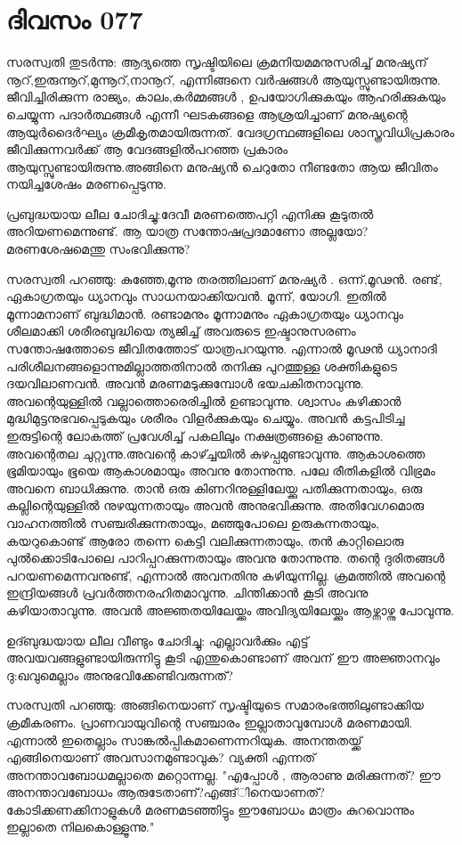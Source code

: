 \newpage
\section{ദിവസം 077}


സരസ്വതി തുടര്‍ന്നു: ആദ്യത്തെ സൃഷ്ടിയിലെ ക്രമനിയമമനുസരിച്ച്‌ മനുഷ്യന്‌ നൂറ്‌,ഇരുന്നൂറ്‌,മുന്നൂറ്‌,നാനൂറ്‌, എന്നിങ്ങനെ വര്‍ഷങ്ങള്‍ ആയുസ്സുണ്ടായിരുന്നു. ജീവിച്ചിരിക്കുന്ന രാജ്യം, കാലം,കര്‍മ്മങ്ങള്‍ , ഉപയോഗിക്കുകയും ആഹരിക്കുകയും ചെയ്യുന്ന പദാര്‍ത്ഥങ്ങള്‍ എന്നീ ഘടകങ്ങളെ ആശ്രയിച്ചാണ്‌ മനുഷ്യന്റെ ആയുര്‍ദൈര്‍ഘ്യം ക്രമീകൃതമായിരുന്നത്‌. വേദഗ്രന്ഥങ്ങളിലെ ശാസ്ത്രവിധിപ്രകാരം ജീവിക്കുന്നവര്‍ക്ക്‌ ആ വേദങ്ങളില്‍പറഞ്ഞ പ്രകാരം ആയുസ്സുണ്ടായിരുന്നു.അങ്ങിനെ മനുഷ്യന്‍ ചെറുതോ നീണ്ടതോ ആയ ജീവിതം നയിച്ചശേഷം മരണപ്പെടുന്നു.

പ്രബുദ്ധയായ ലീല ചോദിച്ചു:ദേവീ മരണത്തെപറ്റി എനിക്കു കൂടുതല്‍ അറിയണമെന്നുണ്ട്‌. ആ യാത്ര സന്തോഷപ്രദമാണോ അല്ലയോ? മരണശേഷമെന്തു സംഭവിക്കുന്നു?

സരസ്വതി പറഞ്ഞു: കുഞ്ഞേ,മൂന്നു തരത്തിലാണ്‌ മനുഷ്യര്‍ . ഒന്ന്,മൂഢന്‍. രണ്ട്‌, ഏകാഗ്രതയും ധ്യാനവും സാധനയാക്കിയവന്‍. മൂന്ന്, യോഗി. ഇതില്‍ മൂന്നാമനാണ്‌ ബുദ്ധിമാന്‍. രണ്ടാമനും മൂന്നാമനും ഏകാഗ്രതയും ധ്യാനവും ശീലമാക്കി ശരീരബുദ്ധിയെ ത്യജിച്ച്‌ അവരുടെ ഇഷ്ടാനുസരണം സന്തോഷത്തോടെ ജീവിതത്തോട്‌ യാത്രപറയുന്നു. എന്നാല്‍ മൂഢന്‍ ധ്യാനാദി   പരിശീലനങ്ങളൊന്നുമില്ലാത്തതിനാല്‍ തനിക്കു പുറത്തുള്ള ശക്തികളുടെ ദയവിലാണവന്‍. അവന്‍ മരണമടുക്കുമ്പോള്‍ ഭയചകിതനാവുന്നു. അവന്റെയുള്ളില്‍ വല്ലാത്തൊരെരിച്ചില്‍ ഉണ്ടാവുന്നു. ശ്വാസം കഴിക്കാന്‍ മുദ്ധിമുട്ടനുഭവപ്പെടുകയും ശരീരം വിളര്‍ക്കുകയും ചെയ്യും. അവന്‍ കട്ടപിടിച്ച ഇരുട്ടിന്റെ ലോകത്ത്‌ പ്രവേശിച്ച്‌ പകലിലും നക്ഷത്രങ്ങളെ കാണുന്നു. അവന്റെതല ചുറ്റുന്നു.അവന്റെ കാഴ്ച്ചയില്‍ കുഴപ്പമുണ്ടാവുന്നു. ആകാശത്തെ ഭൂമിയായും ഭൂയെ ആകാശമായും അവനു തോന്നുന്നു. പലേ രീതികളില്‍ വിഭ്രമം അവനെ ബാധിക്കുന്നു. താന്‍ ഒരു കിണറിനുള്ളിലേയ്ക്കു പതിക്കുന്നതായും, ഒരു കല്ലിന്റെയുള്ളില്‍ നുഴയുന്നതായും അവന്‍ അനുഭവിക്കുന്നു. അതിവേഗമൊരു വാഹനത്തില്‍ സഞ്ചരിക്കുന്നതായും, മഞ്ഞുപോലെ ഉരുകുന്നതായും, കയറുകൊണ്ട്‌ ആരോ തന്നെ കെട്ടി വലിക്കുന്നതായും, തന്‍ കാറ്റിലൊരു പുല്‍ക്കൊടിപോലെ പാറിപ്പറക്കുന്നതായും അവനു തോന്നുന്നു. തന്റെ ദുരിതങ്ങള്‍ പറയണമെന്നവനുണ്ട്‌, എന്നാല്‍ അവനതിനു കഴിയുന്നില്ല. ക്രമത്തില്‍ അവന്റെ ഇന്ദ്രിയങ്ങള്‍ പ്രവര്‍ത്തനരഹിതമാവുന്നു. ചിന്തിക്കാന്‍ കൂടി അവനു കഴിയാതാവുന്നു. അവന്‍ അജ്ഞതയിലേയ്ക്കും അവിദ്യയിലേയ്ക്കും ആഴ്ന്നാഴ്ന്നു പോവുന്നു.

ഉദ്ബുദ്ധയായ ലീല വീണ്ടും ചോദിച്ചു: എല്ലാവര്‍ക്കും എട്ട്‌ അവയവങ്ങളുണ്ടായിരുന്നിട്ടു കൂടി എന്തുകൊണ്ടാണ്‌ അവന്‌ ഈ അജ്ഞാനവും ദു:ഖവുമെല്ലാം അനുഭവിക്കേണ്ടിവരുന്നത്‌? 

സരസ്വതി പറഞ്ഞു: അങ്ങിനെയാണ്‌ സൃഷ്ടിയുടെ സമാരംഭത്തിലുണ്ടാക്കിയ ക്രമീകരണം. പ്രാണവായുവിന്റെ സഞ്ചാരം ഇല്ലാതാവുമ്പോള്‍ മരണമായി. എന്നാല്‍ ഇതെല്ലാം സാങ്കല്‍പ്പികമാണെന്നറിയുക. അനന്തതയ്ക്ക്‌ എങ്ങിനെയാണ്‌ അവസാനമുണ്ടാവുക? വ്യക്തി എന്നത്‌ അനന്താവബോധമല്ലാതെ മറ്റൊന്നല്ല. "എപ്പോള്‍ , ആരാണു മരിക്കുന്നത്‌? ഈ അനന്താവബോധം ആരുടേതാണ്‌?എങ്ങ്‌ിനെയാണത്‌? കോടിക്കണക്കിനാളുകള്‍ മരണമടഞ്ഞിട്ടും ഈബോധം മാത്രം കുറവൊന്നും ഇല്ലാതെ നിലകൊള്ളൂന്നു."
